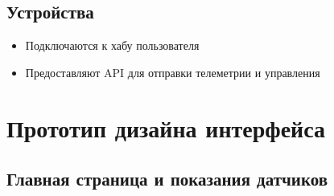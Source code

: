 \documentclass[a4paper,12pt]{article}
\begin{document}
\subsection*{Устройства}
\begin{itemize}[leftmargin=1.5em]
  \item Подключаются к хабу пользователя
  \item Предоставляют API для отправки телеметрии и управления
\end{itemize}

\section*{Прототип дизайна интерфейса}

\subsection*{Главная страница и показания датчиков}
\end{document}
